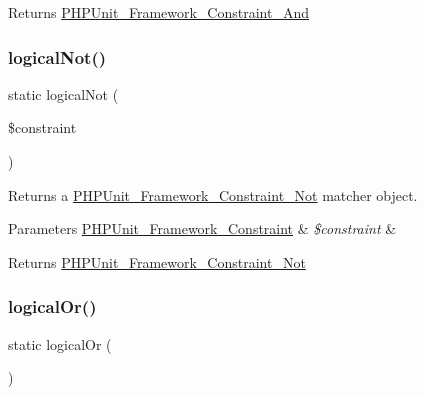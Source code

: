 \begin{DoxyReturn}{Returns}
\mbox{\hyperlink{class_p_h_p_unit___framework___constraint___and}{P\+H\+P\+Unit\+\_\+\+Framework\+\_\+\+Constraint\+\_\+\+And}} 
\end{DoxyReturn}
\mbox{\label{class_p_h_p_unit___framework___assert_a488f6835021a96f3b5f9b314d08fe3e2}} 
\subsubsection{\texorpdfstring{logical\+Not()}{logicalNot()}}
{\footnotesize\ttfamily static logical\+Not (\begin{DoxyParamCaption}\item[{\mbox{\hyperlink{class_p_h_p_unit___framework___constraint}{P\+H\+P\+Unit\+\_\+\+Framework\+\_\+\+Constraint}}}]{\$constraint }\end{DoxyParamCaption})\hspace{0.3cm}{\ttfamily [static]}}

Returns a \mbox{\hyperlink{class_p_h_p_unit___framework___constraint___not}{P\+H\+P\+Unit\+\_\+\+Framework\+\_\+\+Constraint\+\_\+\+Not}} matcher object.


\begin{DoxyParams}[1]{Parameters}
\mbox{\hyperlink{class_p_h_p_unit___framework___constraint}{P\+H\+P\+Unit\+\_\+\+Framework\+\_\+\+Constraint}} & {\em \$constraint} & \\
\hline
\end{DoxyParams}
\begin{DoxyReturn}{Returns}
\mbox{\hyperlink{class_p_h_p_unit___framework___constraint___not}{P\+H\+P\+Unit\+\_\+\+Framework\+\_\+\+Constraint\+\_\+\+Not}} 
\end{DoxyReturn}
\mbox{\label{class_p_h_p_unit___framework___assert_aca8dbf2226f89dff5940fb65d716a060}} 
\subsubsection{\texorpdfstring{logical\+Or()}{logicalOr()}}
{\footnotesize\ttfamily static logical\+Or (\begin{DoxyParamCaption}{ }\end{DoxyParamCaption})\hspace{0.3cm}{\ttfamily [static]}}


